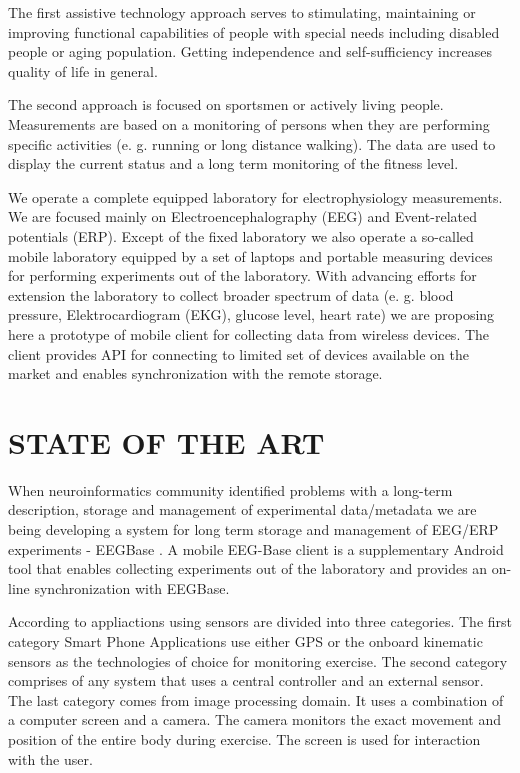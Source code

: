 \documentclass[a4paper,twoside]{article}
\begin{document}
The first assistive technology approach serves to stimulating, maintaining or improving functional capabilities of people with special needs including disabled people or aging population. Getting independence and self-sufficiency increases quality of life in general. 

The second approach is focused on sportsmen or actively living people. Measurements are based on a monitoring of persons when they are performing specific activities (e. g. running or long distance walking). The data are used to display the current status and a long term monitoring of the fitness level. 

We operate a complete equipped laboratory \cite{10.3389/fninf.2014.00020} for electrophysiology measurements. We are focused  mainly on Electroencephalography (EEG) and Event-related potentials (ERP). Except of the fixed laboratory we also operate a so-called mobile laboratory equipped by a set of laptops and portable measuring devices for performing experiments out of the laboratory. With advancing efforts for extension the laboratory to collect broader spectrum of data (e. g. blood pressure, Elektrocardiogram (EKG), glucose level, heart rate) we are proposing here a prototype of mobile client for collecting data from wireless devices. The client provides API for connecting to limited set of devices available on the market and enables synchronization with the remote storage.

\section{\uppercase{state of the art}}
\label{sec:state-of-the-art}

\noindent
 When neuroinformatics community identified problems with a long-term description, storage and management of experimental data/metadata \cite{CRCNS} we are being developing a system for long term storage and management of EEG/ERP experiments - EEGBase \cite{ISI:000306821100004}. A mobile EEG-Base client \cite{10.3389/conf.fninf.2013.09.00046} is a supplementary Android tool that enables collecting experiments out of the laboratory and provides an on-line synchronization with EEGBase.
 
 According to \cite{Lowe2012242} appliactions using sensors are divided into three categories. The first category Smart Phone Applications use either GPS or the
onboard kinematic sensors as the technologies of choice for monitoring exercise. The second category comprises of any system that uses a central controller
and an external sensor. The last category comes from image processing domain. It uses a combination of a computer screen and a camera. The camera monitors the exact movement and position of the entire body during exercise. The screen is used for interaction with the user.
\end{document}
